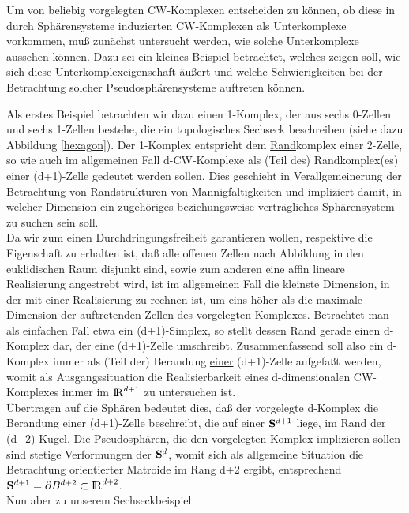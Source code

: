 Um von beliebig vorgelegten CW-Komplexen entscheiden zu können, ob diese in
durch Sphä\-rensysteme induzierten CW-Komplexen als Unterkomplexe vorkommen,
muß zu\-nächst untersucht werden, wie solche Unterkomplexe aussehen können.
Dazu sei ein kleines Beispiel betrachtet, welches zeigen soll, wie sich diese
Unterkomplex\-eigenschaft äußert und welche Schwierigkeiten bei der
Betrachtung solcher Pseudosphärensysteme auftreten können.

Als erstes Beispiel betrachten wir dazu einen 1-Komplex, der aus sechs 0-Zellen
und sechs 1-Zellen bestehe, die ein topologisches Sechseck beschreiben (siehe
dazu Abbildung \ref{hexagon}). Der 1-Komplex entspricht dem \ul{Rand}komplex
einer 2-Zelle, so wie auch im allgemeinen Fall d-CW-Komplexe als (Teil des)
Randkomplex(es) einer (d+1)-Zelle gedeutet werden sollen. Dies geschieht in
Verallgemeinerung der Betrachtung von Randstrukturen von Mannigfaltigkeiten
und impliziert damit, in welcher Dimension ein zugehöriges beziehungsweise
verträgliches Sphärensystem zu suchen sein soll.\\
Da wir zum einen Durchdringungsfreiheit garantieren wollen, respektive die
Eigenschaft zu erhalten ist, daß alle offenen Zellen nach Abbildung in den
euklidischen Raum disjunkt sind, sowie zum anderen eine affin lineare
Realisierung angestrebt wird, ist im allgemeinen Fall die kleinste Dimension,
in der mit einer Realisierung zu rechnen ist, um eins höher als die maximale
Dimension der auftretenden Zellen des vorgelegten Komplexes.
Betrachtet man als einfachen Fall etwa ein (d+1)-Simplex, so stellt dessen Rand
gerade einen d-Komplex dar, der eine (d+1)-Zelle umschreibt.
Zusammenfassend soll also ein d-Komplex immer als (Teil der) Berandung
\ul{einer} (d+1)-Zelle aufgefaßt werden, womit als Ausgangssituation die
Realisierbarkeit eines d-dimensionalen CW-Komplexes immer im $\R^{d+1}$ zu
untersuchen ist.\\
Übertragen auf die Sphären bedeutet dies, daß der vorgelegte d-Komplex
die Berandung einer (d+1)-Zelle beschreibt, die auf einer $\S^{d+1}$ liege,
im Rand der (d+2)-Kugel. Die Pseudosphären, die den vorgelegten Komplex
implizieren sollen sind stetige Verformungen der $\S^d$, womit sich als
allgemeine Situation die Betrachtung orientierter Matroide im Rang d+2 ergibt,
entsprechend $\S^{d+1}=\partial B^{d+2}\subset\R^{d+2}$.\\
Nun aber zu unserem Sechseckbeispiel.

